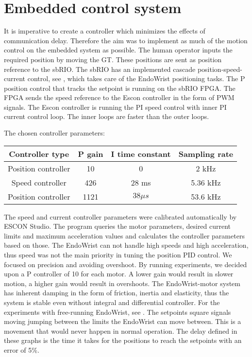 \section{Embedded control system}



It is imperative to create a controller which minimizes the effects of communication delay. Therefore the aim was to implement as much of the motion control on the embedded system as possible. The human operator  inputs the required position by moving the GT. These positions are sent as position reference to the sbRIO. 
The sbRIO has an implemented cascade position-speed-current control, see , which takes care of the EndoWrist positioning tasks. The P position control that tracks the setpoint is running on the sbRIO FPGA. The FPGA sends the speed reference to the Escon controller in the form of PWM signals. The Escon controller is running the PI speed control with inner PI current control loop. The inner loops are faster than the outer loops.

The chosen controller parameters:

\begin{center}
	\begin{tabular}{ c | c | c | c }
		\hline
		Controller type & P gain & I time constant & Sampling rate \\ \hline
		Position controller & 10 & 0 & 2 kHz \\ \hline
		Speed controller & 426 & 28 ms & 5.36 kHz \\ \hline
		Position controller & 1121 & $38 \mu s$ & 53.6 kHz \\ \hline
	\end{tabular}
\end{center}

The speed and current controller parameters were calibrated automatically by ESCON Studio. The program queries the motor parameters, desired current limits and maximum acceleration values and calculates the controller parameters based on those. The EndoWrist can not handle high speeds and high acceleration, thus speed was not the main priority in tuning the position PID control. We focused on precision and avoiding overshoot. By running experiments, we decided upon a P controller of 10 for each motor. A lower gain would result in slower motion, a higher gain would result in overshoots. The EndoWrist-motor system has inherent damping in the form of friction, inertia and elasticity, thus the system is stable even without integral and differential controller. For the experiments with free-running EndoWrist, see . The setpoints square signals moving jumping between the limits the EndoWrist can move between. This is a movement that would never happen in normal operation. The delay defined in these graphs is the time it takes for the positions to reach the setpoints with an error of 5\%.

